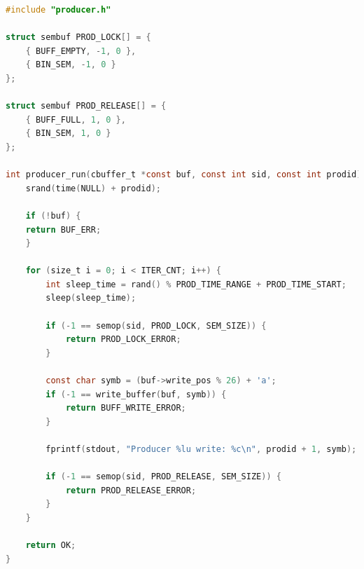 \documentclass[12pt]{report}
\begin{document}
\begin{lstlisting}[label=producer,caption=Реализация <<производителей>>,language=C]
#include "producer.h"

struct sembuf PROD_LOCK[] = { 
	{ BUFF_EMPTY, -1, 0 }, 
	{ BIN_SEM, -1, 0 } 
};

struct sembuf PROD_RELEASE[] = { 
	{ BUFF_FULL, 1, 0 }, 
	{ BIN_SEM, 1, 0 } 
};

int producer_run(cbuffer_t *const buf, const int sid, const int prodid) {
	srand(time(NULL) + prodid);
	
	if (!buf) {
	return BUF_ERR;
	}
	
	for (size_t i = 0; i < ITER_CNT; i++) {
		int sleep_time = rand() % PROD_TIME_RANGE + PROD_TIME_START;
		sleep(sleep_time);
		
		if (-1 == semop(sid, PROD_LOCK, SEM_SIZE)) {
			return PROD_LOCK_ERROR;
		}
		
		const char symb = (buf->write_pos % 26) + 'a';
		if (-1 == write_buffer(buf, symb)) {
			return BUFF_WRITE_ERROR;
		}
		
		fprintf(stdout, "Producer %lu write: %c\n", prodid + 1, symb);
		
		if (-1 == semop(sid, PROD_RELEASE, SEM_SIZE)) {
			return PROD_RELEASE_ERROR;
		}
	}
	
	return OK;
}
\end{lstlisting}
\end{document}
